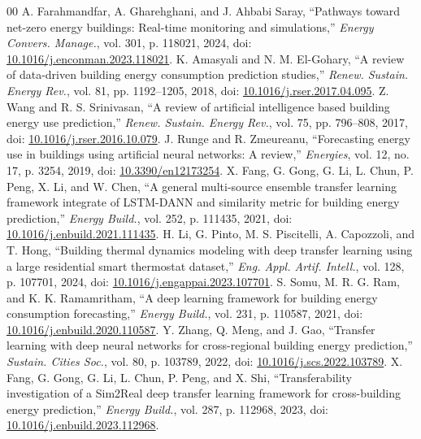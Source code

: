 \documentclass[conference]{IEEEtran}
\begin{document}
\begin{thebibliography}{00}
 A. Farahmandfar, A. Gharehghani, and J. Ahbabi Saray, ``Pathways toward net-zero energy buildings: Real-time monitoring and simulations,'' \textit{Energy Convers. Manage.}, vol. 301, p. 118021, 2024, doi: \href{https://doi.org/10.1016/j.enconman.2023.118021}{10.1016/j.enconman.2023.118021}.
 K. Amasyali and N. M. El-Gohary, ``A review of data-driven building energy consumption prediction studies,'' \textit{Renew. Sustain. Energy Rev.}, vol. 81, pp. 1192--1205, 2018, doi: \href{https://doi.org/10.1016/j.rser.2017.04.095}{10.1016/j.rser.2017.04.095}.
 Z. Wang and R. S. Srinivasan, ``A review of artificial intelligence based building energy use prediction,'' \textit{Renew. Sustain. Energy Rev.}, vol. 75, pp. 796--808, 2017, doi: \href{https://doi.org/10.1016/j.rser.2016.10.079}{10.1016/j.rser.2016.10.079}.
\newpage
{} J. Runge and R. Zmeureanu, ``Forecasting energy use in buildings using artificial neural networks: A review,'' \textit{Energies}, vol. 12, no. 17, p. 3254, 2019, doi: \href{https://doi.org/10.3390/en12173254}{10.3390/en12173254}.
 X. Fang, G. Gong, G. Li, L. Chun, P. Peng, X. Li, and W. Chen, ``A general multi-source ensemble transfer learning framework integrate of LSTM-DANN and similarity metric for building energy prediction,'' \textit{Energy Build.}, vol. 252, p. 111435, 2021, doi: \href{https://doi.org/10.1016/j.enbuild.2021.111435}{10.1016/j.enbuild.2021.111435}.
 H. Li, G. Pinto, M. S. Piscitelli, A. Capozzoli, and T. Hong, ``Building thermal dynamics modeling with deep transfer learning using a large residential smart thermostat dataset,'' \textit{Eng. Appl. Artif. Intell.}, vol. 128, p. 107701, 2024, doi: \href{https://doi.org/10.1016/j.engappai.2023.107701}{10.1016/j.engappai.2023.107701}.
 S. Somu, M. R. G. Ram, and K. K. Ramamritham, ``A deep learning framework for building energy consumption forecasting,'' \textit{Energy Build.}, vol. 231, p. 110587, 2021, doi: \href{https://doi.org/10.1016/j.enbuild.2020.110587}{10.1016/j.enbuild.2020.110587}.
 Y. Zhang, Q. Meng, and J. Gao, ``Transfer learning with deep neural networks for cross-regional building energy prediction,'' \textit{Sustain. Cities Soc.}, vol. 80, p. 103789, 2022, doi: \href{https://doi.org/10.1016/j.scs.2022.103789}{10.1016/j.scs.2022.103789}.
 X. Fang, G. Gong, G. Li, L. Chun, P. Peng, and X. Shi, ``Transferability investigation of a Sim2Real deep transfer learning framework for cross-building energy prediction,'' \textit{Energy Build.}, vol. 287, p. 112968, 2023, doi: \href{https://doi.org/10.1016/j.enbuild.2023.112968}{10.1016/j.enbuild.2023.112968}.

\end{thebibliography}
\end{document}
